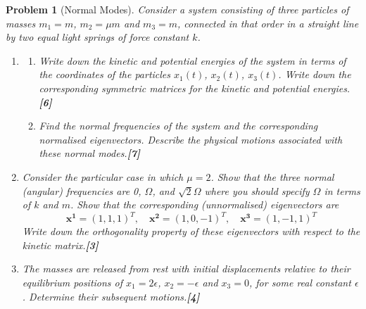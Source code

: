 \documentclass[a4paper]{article}
\theoremstyle{new}
\newtheorem{qns}{Problem}[section]
\begin{document}
\begin{qns}[Normal Modes]
Consider a system consisting of three particles of masses $m_1=m$, $m_2 =\mu m$ and $m_3 = m$, connected in that order in a straight line by two equal light springs of force constant $k$.
\begin{enumerate}[label=(\alph*)]
\item 
\begin{enumerate}[label=(\roman*)]
\item Write down the kinetic and potential energies of the system in terms of the
coordinates of the particles $x_1(t)$, $x_2(t)$, $x_3(t)$. Write down the corresponding symmetric matrices for the kinetic and potential energies.\hfill\textbf{[6]}
\item Find the normal frequencies of the system and the corresponding normalised eigenvectors. Describe the physical motions associated with these normal modes.\hfill\textbf{[7]}
\end{enumerate}
\item Consider the particular case in which $\mu=2$. Show that the three normal (angular) frequencies are 0, $\Omega$, and $\sqrt{2}\Omega$ where you should specify $\Omega$ in terms of $k$ and $m$. Show that the corresponding (unnormalised) eigenvectors are
$$\mathbf{x^1}=(1,1,1)^T,\quad\mathbf{x^2}=(1,0,-1)^T,\quad\mathbf{x^3}=(1,-1,1)^T$$
Write down the orthogonality property of these eigenvectors with respect to the kinetic matrix.\hfill\textbf{[3]}
\item The masses are released from rest with initial displacements relative to their equilibrium positions of $x_1=2\epsilon$, $x_2=-\epsilon$ and $x_3 = 0$, for some real constant $\epsilon$. Determine their subsequent motions.\hfill\textbf{[4]}
\end{enumerate}
\end{qns}
\end{document}
